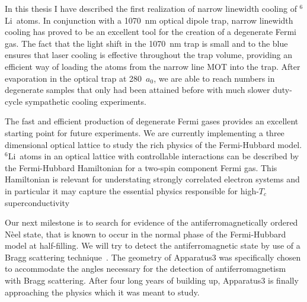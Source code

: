 \documentclass[oneside,12pt]{memoir}
\newcommand{\li} {\ensuremath{^{6}}Li\ }
\begin{document}
In this thesis I have described the first realization of narrow linewidth
cooling of \li atoms.  In conjunction with a 1070~nm optical dipole trap,
narrow linewidth cooling has proved to be an excellent tool for the creation of
a degenerate Fermi gas. The fact that the light shift in the 1070~nm trap is
small and to the blue ensures that laser cooling is effective throughout the
trap volume, providing an efficient way of loading the atoms from the narrow
line MOT into the trap.  After evaporation in the optical trap at 280~$a_{0}$,
we are able to reach numbers in  degenerate samples that only had been attained
before with much slower duty-cycle sympathetic cooling experiments.  

The fast and efficient production of degenerate Fermi gases provides an
excellent starting point for future experiments.  We are currently implementing
a three dimensional optical lattice to study the rich physics of the
Fermi-Hubbard model.  \li atoms in an optical lattice with controllable
interactions can be described by the Fermi-Hubbard Hamiltonian for a two-spin
component Fermi gas.  This Hamiltonian is relevant for understating strongly
correlated electron systems and in particular it may capture the essential
physics responsible for high-$T_{c}$ superconductivity~\cite{Anderson2002}

Our next milestone is to search for evidence of the antiferromagnetically
ordered N\`{e}el state, that is known to occur in the normal phase of the
Fermi-Hubbard model at half-filling.  We will try to detect the
antiferromagnetic state by use of a Bragg scattering
technique~\cite{Ted2010}.  The geometry of Apparatus3 was specifically chosen
to accommodate the angles necessary for the detection of antiferromagnetism
with Bragg scattering. After four long years of building up, Apparatus3 is
finally approaching the physics which it was meant to study. 






%
%
%

\end{document}
